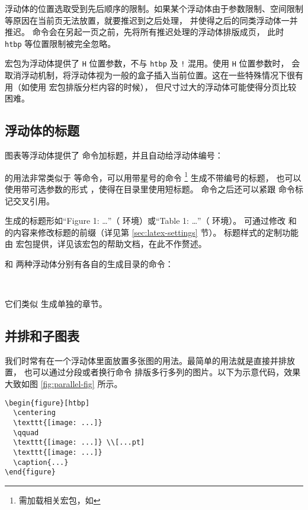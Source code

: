 浮动体的位置选取受到先后顺序的限制。如果某个浮动体由于参数限制、空间限制等原因在当前页无法放置，就要推迟到之后处理，
并使得之后的同类浮动体一并推迟。 命令会在另起一页之前，先将所有推迟处理的浮动体排版成页，
此时 \texttt{htbp} 等位置限制被完全忽略。


 宏包为浮动体提供了 \texttt{H} 位置参数，不与 \texttt{htbp} 及 \texttt{!} 混用。使用 \texttt{H} 位置参数时，
会取消浮动机制，将浮动体视为一般的盒子插入当前位置。这在一些特殊情况下很有用（如使用  宏包排版分栏内容的时候），
但尺寸过大的浮动体可能使得分页比较困难。

\subsection{浮动体的标题}\label{subsec:caption}

图表等浮动体提供了  命令加标题，并且自动给浮动体编号：
\begin{command}
\marg*{\ldots}
\end{command}
 的用法非常类似于  等命令，可以用带星号的命令 \footnote{需加载相关宏包，如 } 生成不带编号的标题，
也可以使用带可选参数的形式 \oarg*{\ldots}\marg*{\ldots}，使得在目录里使用短标题。
 命令之后还可以紧跟  命令标记交叉引用。

 生成的标题形如“Figure 1: \ldots”（ 环境）或“Table 1: \ldots”（ 环境）。
可通过修改  和  的内容来修改标题的前缀（详见第 \ref{sec:latex-settings} 节）。
标题样式的定制功能由  宏包提供，详见该宏包的帮助文档，在此不作赘述。

 和  两种浮动体分别有各自的生成目录的命令：
\begin{command}
 \\
\end{command}

它们类似  生成单独的章节。

\subsection{并排和子图表}\label{subsec:subfig}

我们时常有在一个浮动体里面放置多张图的用法。最简单的用法就是直接并排放置，
也可以通过分段或者换行命令 \crcmd{} 排版多行多列的图片。以下为示意代码，效果大致如图 \ref{fig:parallel-fig} 所示。
\begin{verbatim}
\begin{figure}[htbp]
  \centering
  \texttt{[image: ...]}
  \qquad
  \texttt{[image: ...]} \\[...pt]
  \texttt{[image: ...]}
  \caption{...}
\end{figure}
\end{verbatim}

